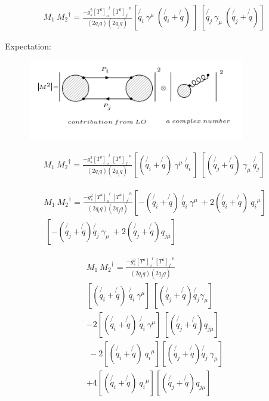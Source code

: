 \begin{equation}
\begin{split}
M_1\: {M_2}^{\dagger} = \frac{-g_s^2 {[T^a]_o}^l \:{[T^a]_{f^{\prime}}}^n }{(2q_i q)(2q_j q)} [\not{q_i}\: \gamma^{\mu} \: (\not{q_i} + \not{q})\: ]
\:[\not{q_j} \:\gamma_{\mu} \: (\not{q_j} + \not{q})]\:
\end{split}
\end{equation}

Expectation:
\begin{figure}[h!]
\centering
\includegraphics[width=0.85\textwidth]{images/expectationM1M2dagger.png}
\end{figure}


\begin{equation}
\begin{split}
M_1\: {M_2}^{\dagger} = \frac{-g_s^2 {[T^a]_o}^l \:{[T^a]_{f^{\prime}}}^n }{(2q_i q)(2q_j q)} [(\not{q_i} + \not{q})\: \gamma^{\mu} \:  \not{q_i}\:]
\:[(\not{q_j} + \not{q}) \:\gamma_{\mu} \:\not{q_j} ]\:
\end{split}
\end{equation}


\begin{equation}
\begin{split}
M_1\: {M_2}^{\dagger} = \frac{-g_s^2 {[T^a]_o}^l \:{[T^a]_{f^{\prime}}}^n }{(2q_i q)(2q_j q)} [-(\not{q_i} + \not{q})\:\not{q_i}\: \gamma^{\mu} \:+2(\not{q_i} + \not{q})\:{q_{i}}^{\mu}]\\
\:[-(\not{q_j} + \not{q}) \not{q_j} \:\gamma_{\mu} \: + 2(\not{q_j} + \not{q}) {q_{j{\mu}}}]\:
\end{split}
\end{equation}


\begin{equation}
\begin{split}
M_1\: {M_2}^{\dagger} = \frac{-g_s^2 {[T^a]_o}^l \:{[T^a]_{f^{\prime}}}^n }{(2q_i q)(2q_j q)} \\
[(\not{q_i} + \not{q})\:\not{q_i}\: \gamma^{\mu}] \:[(\not{q_j} + \not{q}) \not{q_j} \gamma_{\mu}] \\
-2[(\not{q_i} + \not{q})\:\not{q_i}\: \gamma^{\mu}]\:[ (\not{q_j} + \not{q}) {q_{j{\mu}}}]\\
\:-2[(\not{q_i} + \not{q})\:{q_{i}}^{\mu}][(\not{q_j} + \not{q}) \not{q_j} \:\gamma_{\mu}]\\
+4[(\not{q_i} + \not{q})\:{q_{i}}^{\mu}][(\not{q_j} + \not{q}) {q_{j{\mu}}}]
\end{split}
\end{equation}

